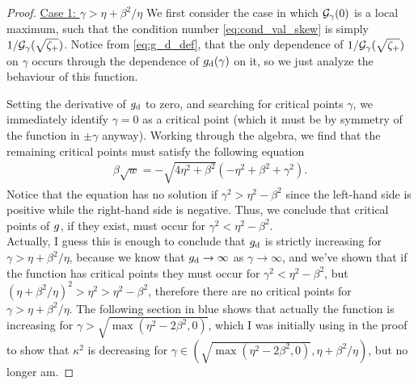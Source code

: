 \documentclass[a4paper,10pt]{article}
\begin{document}
{\begin{itemize}
\begin{proof}
\underline{Case 1: $\gamma > \eta + \beta^2/\eta$} \quad We first consider the case in which ${\cal G}_{\gamma}(0)$ is a local maximum, such that the condition number \eqref{eq:cond_val_skew} is simply $1/{\cal G}_{\gamma}(\sqrt{\zeta_+})$. Notice from \eqref{eq:g_d_def}, that the only dependence of $1/{\cal G}_{\gamma}(\sqrt{\zeta_+})$ on $\gamma$ occurs through the dependence of $g_{\rm d}(\gamma)$ on it, so we just analyze the behaviour of this function.

Setting the derivative of $g_{\rm d}$ to zero, and searching for critical points $\gamma$, we immediately identify $\gamma =  0$ as a critical point (which it must be  by symmetry of the function in $\pm \gamma$ anyway). Working through the algebra, we find that the remaining critical points must satisfy the following equation
\begin{align}
\beta \sqrt{w} = - \sqrt{4 \eta^2 + \beta^2} (-  \eta^2 + \beta^2 + \gamma^2).
\end{align}
Notice that the equation has no solution if $\gamma^2 > \eta^2 - \beta^2$ since the left-hand side is positive while the right-hand side is negative. Thus, we conclude that critical points of $g_{\rm}$, if they exist, must occur for $\gamma^2 < \eta^2 - \beta^2$. \\

Actually, I guess this is enough to conclude that $g_{\rm d}$ is strictly increasing for $\gamma > \eta + \beta^2/\eta$, because we know that $g_{\rm d} \to \infty$ as $\gamma \to \infty$, and we've shown that if the function has critical points they must occur for $\gamma^2 < \eta^2 - \beta^2$, but $(\eta + \beta^2/\eta)^2 >  \eta^2 > \eta^2 - \beta^2$, therefore there are no critical points for $\gamma > \eta + \beta^2/\eta$. The following section in blue shows that actually the function is increasing for $\gamma > \sqrt{\max(\eta^2 - 2 \beta^2,0)}$, which I was initially using in the proof to show that $\kappa^2$ is decreasing for $\gamma \in (\sqrt{\max(\eta^2 - 2 \beta^2,0)}, \eta + \beta^2/\eta)$, but no longer am.


\end{proof}
\end{itemize}}
\end{document}
